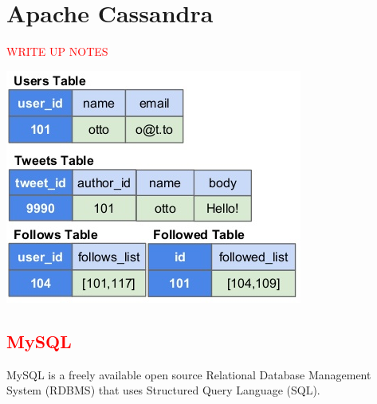 \section{Apache Cassandra}\label{cassandra}
\textcolor{red}{WRITE UP NOTES}\begin{center}\includegraphics[width=0.75\linewidth]{images/cassandramodel}\end{center}

\textcolor{red}{\section{MySQL}\label{mysql}}
MySQL is a freely available open source Relational Database Management System (RDBMS) that uses Structured Query Language (SQL).